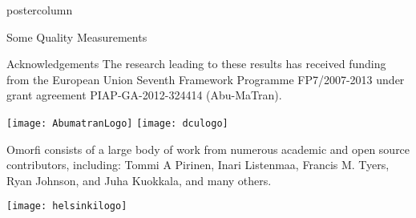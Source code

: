 \documentclass[final,hyperref={pdfpagelabels}]{beamer}
\begin{document}
\begin{frame}
\begin{columns}
\begin{column}{.49\textwidth}
\begin{beamercolorbox}[center,wd=\textwidth]{postercolumn}
\begin{minipage}[T]{.95\textwidth}
{\begin{block}{Some Quality Measurements}
        \end{block}



        \begin{block}{Acknowledgements}
            The research leading to these results has received
            funding from the European Union Seventh Framework
            Programme FP7/2007-2013 under grant agreement
            PIAP-GA-2012-324414 (Abu-MaTran).

            \texttt{[image: AbumatranLogo]}
            \texttt{[image: dculogo]}

            Omorfi consists of a large body of work from numerous academic and
            open source contributors, including: Tommi A Pirinen, Inari
            Listenmaa, Francis M. Tyers, Ryan Johnson, and Juha Kuokkala,
            and many others.

            \texttt{[image: helsinkilogo]}

      \end{block}
         }
        \end{minipage}
      \end{beamercolorbox}
    \end{column}
  \end{columns}

  \end{frame}
\end{document}
